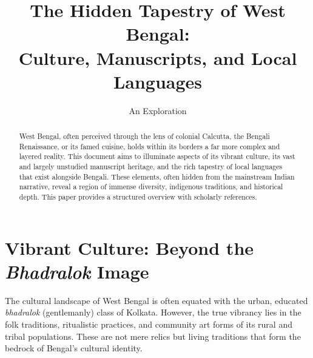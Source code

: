 \documentclass{article}
\begin{document}
\title{The Hidden Tapestry of West Bengal:\\Culture, Manuscripts, and Local Languages}
\author{An Exploration}
\date{}
\maketitle

\begin{abstract}
West Bengal, often perceived through the lens of colonial Calcutta, the Bengali Renaissance, or its famed cuisine, holds within its borders a far more complex and layered reality. This document aims to illuminate aspects of its vibrant culture, its vast and largely unstudied manuscript heritage, and the rich tapestry of local languages that exist alongside Bengali. These elements, often hidden from the mainstream Indian narrative, reveal a region of immense diversity, indigenous traditions, and historical depth. This paper provides a structured overview with scholarly references.
\end{abstract}

\section{Vibrant Culture: Beyond the \textit{Bhadralok} Image}
The cultural landscape of West Bengal is often equated with the urban, educated \textit{bhadralok} (gentlemanly) class of Kolkata. However, the true vibrancy lies in the folk traditions, ritualistic practices, and community art forms of its rural and tribal populations. These are not mere relics but living traditions that form the bedrock of Bengal's cultural identity.
\end{document}
